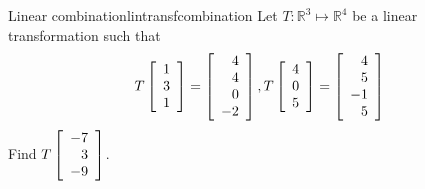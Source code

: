 \begin{example}{Linear combination}{lintransfcombination}
Let $T:\mathbb{R}^3 \mapsto \mathbb{R}^4$ be a linear transformation such that 
\[
T \left[ \begin{array}{r}
1 \\
3 \\
1
\end{array} \right]
=
\left[ \begin{array}{r}
4 \\
4 \\
0 \\
-2
\end{array} \right],
T \left[ \begin{array}{r}
4 \\
0 \\
5
\end{array} \right]
=
\left[ \begin{array}{r}
4 \\
5 \\
-1 \\
5
\end{array} \right]
\]
Find $T \left[ \begin{array}{r}
-7 \\
3 \\
-9
\end{array} \right]$.
\end{example}

